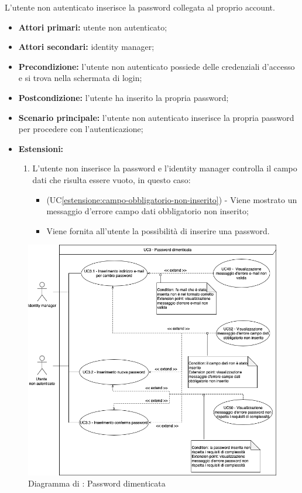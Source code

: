 L'utente non autenticato inserisce la password collegata al proprio account.
\begin{itemize}
	\item \textbf{Attori primari:} utente non autenticato;
	\item \textbf{Attori secondari:} identity manager;
	\item \textbf{Precondizione:} l'utente non autenticato possiede delle credenziali d'accesso e si trova nella schermata di login;
	\item \textbf{Postcondizione:} l'utente ha inserito la propria password;
	\item \textbf{Scenario principale:} l'utente non autenticato inserisce la propria password per procedere con l'autenticazione;
	\item \textbf{Estensioni:} 
	\begin{enumerate}[label=\lett]
		\item L'utente non inserisce la password e l'identity manager controlla il campo dati che risulta essere vuoto, in questo caso:
		\begin{itemize}
			\item (UC\ref{estensione:campo-obbligatorio-non-inserito}) - Viene mostrato un messaggio d'errore campo dati obbligatorio non inserito;
			\item Viene fornita all'utente la possibilità di inserire una password.
		\end{itemize}
	\end{enumerate}
\end{itemize}

\label{password-dimenticata}

\begin{figure}[H]
    \centering
    \includegraphics[scale=0.5]{Immagini/DiagrammiUC/AccessoAllaPiattaforma/PasswordDimenticata.png}
    \caption{Diagramma di \actualUC: Password dimenticata} 
    \label{fig:password-dimenticata}
\end{figure}

